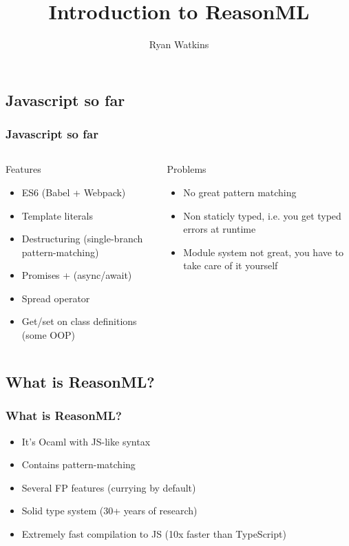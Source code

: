 \documentclass{beamer}
\author{Ryan Watkins}
\title{Introduction to ReasonML}
\begin{document}
\begin{frame}
  \titlepage
\end{frame}

\begin{frame}
  \section{Javascript so far}
  \frametitle{Javascript so far}
  \pause
  \begin{columns}
    \begin{block}{Features}
      \begin{itemize}
      \item<2-> ES6 (Babel + Webpack)
      \item<3-> Template literals
      \item<4-> Destructuring (single-branch pattern-matching)
      \item<5-> Promises + (async/await)
      \item<6-> Spread operator
      \item<7-> Get/set on class definitions (some OOP)
      \end{itemize}
    \end{block}
    \begin{block}{Problems}
      \begin{itemize}
      \item<8-> No great pattern matching
      \item<9-> Non staticly typed, i.e. you get typed errors at runtime
      \item<10-> Module system not great, you have to take care of it yourself
      \end{itemize}
    \end{block}
  \end{columns}
\end{frame}

\begin{frame}
  \section{What is ReasonML?}
  \frametitle{What is ReasonML?}
  \pause
  \begin{itemize}
  \item It's Ocaml with JS-like syntax
    \pause
  \item Contains pattern-matching
    \pause
  \item Several FP features (currying by default)
    \pause
  \item Solid type system (30+ years of research)
    \pause
  \item Extremely fast compilation to JS (10x faster than TypeScript)
  \end{itemize}
\end{frame}
\end{document}
